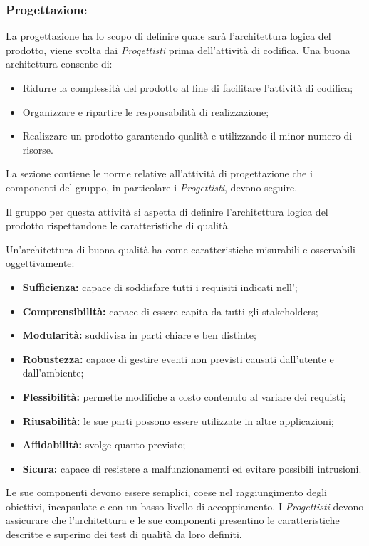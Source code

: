 \subsubsection{Progettazione}
 \label{PS_Progettazione_Scopo}La progettazione ha lo scopo di definire quale sarà l'architettura logica del prodotto, viene svolta dai \textit{Progettisti} prima dell'attività di codifica. Una buona architettura consente di:
\begin{itemize}
	\item Ridurre la complessità del prodotto al fine di facilitare l'attività di codifica;
	\item Organizzare e ripartire le responsabilità di realizzazione;
	\item Realizzare un prodotto garantendo qualità e utilizzando il minor numero di risorse.
\end{itemize} 

La sezione contiene le norme relative all'attività di progettazione che i componenti del gruppo, in particolare i \textit{Progettisti}, devono seguire.

Il gruppo per questa attività si aspetta di definire l'architettura logica del prodotto rispettandone le caratteristiche di qualità.

\label{QualitàProgettazione}Un'architettura di buona qualità ha come caratteristiche misurabili e osservabili oggettivamente:
\begin{itemize}
	\item \textbf{Sufficienza:} capace di soddisfare tutti i requisiti indicati nell'\textit{\AdR}; 
	\item \textbf{Comprensibilità:} capace di essere capita da tutti gli stakeholders;
	\item \textbf{Modularità:} suddivisa in parti chiare e ben distinte;
	\item \textbf{Robustezza:} capace di gestire eventi non previsti causati dall'utente e dall'ambiente;
	\item \textbf{Flessibilità:} permette modifiche a costo contenuto al variare dei requisti;
	\item \textbf{Riusabilità:} le sue parti possono essere utilizzate in altre applicazioni;
	\item \textbf{Affidabilità:} svolge quanto previsto;
	\item \textbf{Sicura:} capace di resistere a malfunzionamenti ed evitare possibili intrusioni.
\end{itemize}
Le sue componenti devono essere semplici, coese nel raggiungimento degli obiettivi, incapsulate e con un basso livello di accoppiamento.
I \textit{Progettisti} devono assicurare che l'architettura e le sue componenti presentino le caratteristiche descritte e superino dei test di qualità da loro definiti.

